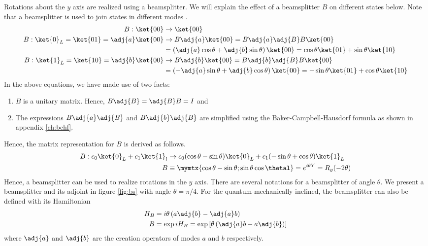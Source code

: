 Rotations about the $y$ axis are realized using a beamsplitter. We will explain the effect of a beamsplitter $B$ on different states below. Note that a beamsplitter is used to join states in different modes \cite{klm,nielsen2000}.
\begin{align}
B:\ket{00} &\rightarrow \ket{00}\\
B:\ket{0}_L = \ket{01} = \adj{a}\ket{00} &\rightarrow B\adj{a}\ket{00} = B\adj{a}\adj{B}B\ket{00}\\
&= \left(\adj{a}\cos\theta + \adj{b}\sin\theta\right)\ket{00} = \cos\theta\ket{01} + \sin\theta\ket{10}\\
B:\ket{1}_L = \ket{10} = \adj{b}\ket{00} &\rightarrow B\adj{b}\ket{00} = B\adj{b}\adj{B}B\ket{00}\\
&= \left(-\adj{a}\sin\theta + \adj{b}\cos\theta\right)\ket{00} = -\sin\theta\ket{01} + \cos\theta\ket{10}
\end{align}
In the above equations, we have made use of two facts: 
\begin{enumerate}
\item $B$ is a unitary matrix. Hence, $B\adj{B} = \adj{B}B = I$ and
\item The expressions $B\adj{a}\adj{B}$ and $B\adj{b}\adj{B}$ are simplified using the Baker-Campbell-Hausdorf formula as shown in appendix \ref{ch:bchf}.
\end{enumerate}
Hence, the matrix representation for $B$ is derived as follows.
\begin{align}
B: c_0\ket{0}_L + c_1\ket{1}_l &\rightarrow c_0(\cos\theta - \sin\theta)\ket{0}_L + c_1(-\sin\theta + \cos\theta)\ket{1}_L \\
B &\equiv \mymtx{\cos\theta -\sin\theta;\sin\theta \cos\thetal} = e^{i\theta Y} = R_y(-2\theta)
\end{align}
Hence, a beamsplitter can be used to realize rotations in the $y$ axis. There are several notations for a beamsplitter of angle $\theta$. We present a beamsplitter and its adjoint in figure \ref{fig:bs} with angle $\theta = \pi/4$.
For the quantum-mechanically inclined, the beamsplitter can also be defined with its Hamiltonian
\begin{align}
H_B &= i\theta\left(a\adj{b} - \adj{a}b\right)\\
B &= \exp{iH_B} = \text{exp}\left[\theta\left(\adj{a}b-a\adj{b}\right)\right]
\end{align}
where $\adj{a}$ and $\adj{b}$ are the creation operators of modes $a$ and $b$ respectively.

